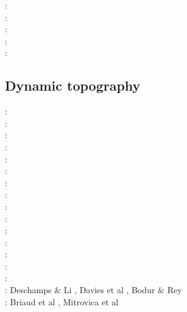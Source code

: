 \begin{scriptsize}
\twothousandseven: \cite{werr07}\\
\twothousandten: \cite{jaml10}\\
\twothousandeleven: \cite{rera11}\\
\twothousandfifteen: \cite{matv15}\\
\twothousandnineteen: \cite{gubg19}
\end{scriptsize}


\subsection{Dynamic topography} 

\begin{scriptsize}
\nineteeneightyfive: \cite{hacr85}\\
\nineteeneightyseven: \cite{repa87}\\
\nineteenninetytwo: \cite{kiha92}\\
\nineteenninetythree: \cite{gurn93}\cite{gurn93b}\\
\nineteenninetynine: \cite{bumo99}\\
\twothousandthree: \cite{cogu03}\\
\twothousandnine: \cite{cohu09}\\
\twothousandten: \cite{bofb10}\cite{brau10}\cite{stfh10}\cite{shml10}\\
\twothousandeleven: \cite{rapy11}\\
\twothousandtwelve: \cite{shlm12}\cite{zhzf12}\\
\twothousandthirteen: \cite{brrs13}\cite{flgm13}\\
\twothousandfifteen: \cite{aupm15}\cite{kiff15}\cite{dali15}\\
\twothousandsixteen: \cite{howa16}\cite{gvfb16}\cite{yagu16}\cite{stei16}\cite{cogb16}\\
\twothousandseventeen: \cite{yamm17}\cite{aumh17}\cite{grrb17}\\
\twothousandeighteen: \cite{osss18}\cite{vibc18}\\
\twothousandnineteen: Deschamps \& Li \cite{deli19}, Davies et al \cite{davk19}, Bodur \& Rey \cite{bore19}\\
\twothousandtwenty: Briaud et al \cite{braf20}, Mitrovica et al \cite{miac20}
\end{scriptsize}


